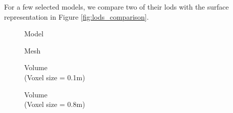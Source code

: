 For a few selected models, we compare two of their \acsp{lod} with the surface representation in Figure \ref{fig:lods_comparison}.
\begin{figure}[t]
    \begin{center}
        \begin{minipage}[c]{0.24\textwidth}
            \begin{flushleft}
                Model
            \end{flushleft}
        \end{minipage}
        \begin{minipage}[c]{0.24\textwidth}
            \centering
            Mesh
        \end{minipage}
        \begin{minipage}[c]{0.24\textwidth}
            \centering
            Volume \\ (Voxel size = 0.1m)
        \end{minipage}
        \begin{minipage}[c]{0.24\textwidth}
            \centering
            Volume \\ (Voxel size = 0.8m)
        \end{minipage}
    

\end{center}
\end{figure}
